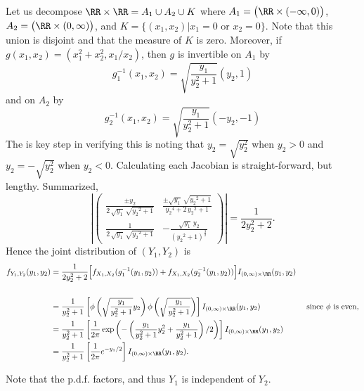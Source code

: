 \documentclass{stat_homework}
\begin{document}
Let us decompose $\RR \times \RR = A_1\cup A_2 \cup K$ where $A_1 = \big(\RR\times(-\infty,0)\big)$, $ A_2 = \big(\RR \times (0,\infty)\big)$, and  $K=\{(x_1,x_2)|x_1 = 0\text{ or }x_2=0\}$. Note that this union is disjoint and that the measure of $K$ is zero. Moreover, if $ g(x_1,x_2) = (x_1^2 + x_2^2, x_1/x_2) $, then $g$ is invertible on $A_1$ by
  $$ g_1^{-1}(x_1,x_2) = \sqrt{\frac{y_1}{y_2^2 +1}} (y_2,1) $$
and on $A_2$ by
  $$ g_2^{-1}(x_1,x_2) = \sqrt{\frac{y_1}{y_2^2 +1}} (-y_2,-1) $$
The is key step in verifying this is noting that $y_2 = \sqrt{y_2^2}$ when $y_2>0$ and $y_2 = -\sqrt{y_2^2}$ when $y_2<0$. Calculating each Jacobian is straight-forward, but lengthy.  Summarized,
$$
\left|
\begin{pmatrix}
  \frac{\pm y_2}{2\,\sqrt{y_1}\,\sqrt{{y_2}^{2}+1}} & 
  \frac{\pm \sqrt{y_1}\,\sqrt{{y_2}^{2}+1}}{{y_2}^{4}+2\,{y_2}^{2}+1}\\ 
  \frac{1}{2\,\sqrt{y_1}\,\sqrt{{y_2}^{2}+1}} &
   -\frac{\sqrt{y_1}\,y_2}{{\left( {y_2}^{2}+1\right) }^{\frac{3}{2}}}\end{pmatrix}\right|
= \frac{1}{2y_2^2 + 2}.
$$
Hence the joint distribution of $(Y_1,Y_2)$ is 
\begin{align*}
  f_{Y_1,Y_2}(y_1,y_2) 
  &= \frac{1}{2y_2^2 + 2} \Big[f_{X_1,X_2}(g_1^{-1}(y_1,y_2)) + f_{X_1,X_2}(g_2^{-1}(y_1,y_2))\Big]I_{(0,\infty)\times\RR}(y_1,y_2)\\
\\
  &= \frac{1}{y_2^2 + 1} \left[ \phi \left( \sqrt{\frac{y_1}{y_2^2+1}}y_2 \right) \phi \left( \sqrt{\frac{y_1}{y_2^2+1}} \right) \right] 
  I_{(0,\infty)\times\RR}(y_1,y_2) & \text{ since $\phi$ is even,}\\
  &= \frac{1}{y_2^2 + 1} \left[ \frac{1}{2\pi}\exp \left(-\left( \frac{y_1}{y_2^2+1}y_2^2 + \frac{y_1}{y_2^2+1} \right)/2 \right)\right] I_{(0,\infty)\times\RR}(y_1,y_2)\\
  &= \frac{1}{y_2^2 + 1} \left[ \frac{1}{2\pi}e^{- y_1 /2}\right] I_{(0,\infty)\times\RR}(y_1,y_2).\\
\end{align*}

Note that the p.d.f. factors, and thus $Y_1$ is independent of $Y_2$.
\end{document}
